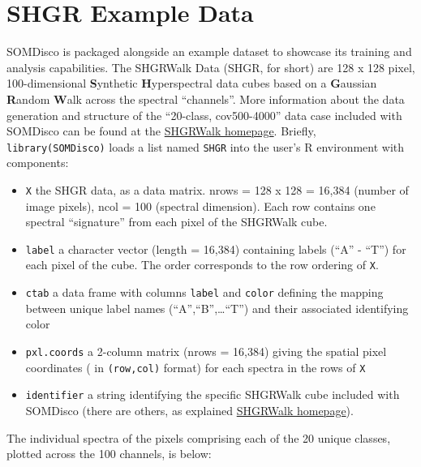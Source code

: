 \documentclass[]{article}
\providecommand{\tightlist}{%
  \setlength{\itemsep}{0pt}\setlength{\parskip}{0pt}}
\begin{document}
\hypertarget{shgr-example-data}{%
\section{SHGR Example Data}\label{shgr-example-data}}

SOMDisco is packaged alongside an example dataset to showcase its training and analysis capabilities. The SHGRWalk Data (SHGR, for short) are 128 x 128 pixel, 100-dimensional \textbf{S}ynthetic \textbf{H}yperspectral data cubes based on a \textbf{G}aussian \textbf{R}andom \textbf{W}alk across the spectral ``channels''. More information about the data generation and structure of the ``20-class, cov500-4000'' data case included with SOMDisco can be found at the \href{https://somdisco.github.io/SHGRWalk/output/index.html}{SHGRWalk homepage}. Briefly, \texttt{library(SOMDisco)} loads a list named \texttt{SHGR} into the user's R environment with components:

\begin{itemize}
\tightlist
\item
  \texttt{X} the SHGR data, as a data matrix. nrows = 128 x 128 = 16,384 (number of image pixels), ncol = 100 (spectral dimension). Each row contains one spectral ``signature'' from each pixel of the SHGRWalk cube.\\
\item
  \texttt{label} a character vector (length = 16,384) containing labels (``A'' - ``T'') for each pixel of the cube. The order corresponds to the row ordering of \texttt{X}.\\
\item
  \texttt{ctab} a data frame with columns \texttt{label} and \texttt{color} defining the mapping between unique label names (``A'',``B'',\ldots{}``T'') and their associated identifying color
\item
  \texttt{pxl.coords} a 2-column matrix (nrows = 16,384) giving the spatial pixel coordinates ( in \texttt{(row,col)} format) for each spectra in the rows of \texttt{X}
\item
  \texttt{identifier} a string identifying the specific SHGRWalk cube included with SOMDisco (there are others, as explained \href{https://somdisco.github.io/SHGRWalk/output/index.html}{SHGRWalk homepage}).
\end{itemize}

The individual spectra of the pixels comprising each of the 20 unique classes, plotted across the 100 channels, is below:
\end{document}

